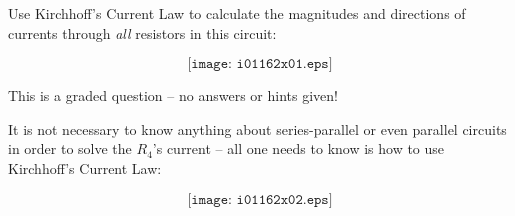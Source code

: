 

Use Kirchhoff's Current Law to calculate the magnitudes and directions of currents through {\it all} resistors in this circuit:

$$\texttt{[image: i01162x01.eps]}$$

\vfil 

\eject






This is a graded question -- no answers or hints given!







It is not necessary to know anything about series-parallel or even parallel circuits in order to solve the $R_4$'s current -- all one needs to know is how to use Kirchhoff's Current Law:

$$\texttt{[image: i01162x02.eps]}$$




